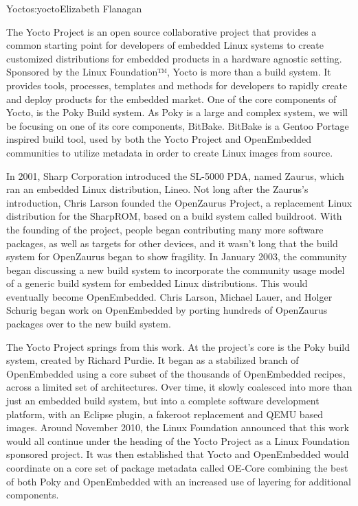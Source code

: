 \begin{aosachapter}{Yocto}{s:yocto}{Elizabeth Flanagan}

The Yocto Project\textsuperscript{\textregistered} is an open source
collaborative project that provides a common starting point for
developers of embedded Linux systems to create customized
distributions for embedded products in a hardware agnostic
setting. Sponsored by the Linux Foundation™, Yocto is more than a
build system. It provides tools, processes, templates and methods for
developers to rapidly create and deploy products for the embedded
market. One of the core components of Yocto, is the Poky Build
system. As Poky is a large and complex system, we will be focusing on
one of its core components, BitBake.  BitBake is a Gentoo Portage
inspired build tool, used by both the Yocto Project and OpenEmbedded
communities to utilize metadata in order to create Linux images from
source.

In 2001, Sharp Corporation introduced the SL-5000 PDA, named Zaurus,
which ran an embedded Linux distribution, Lineo. Not long after the
Zaurus's introduction, Chris Larson founded the OpenZaurus Project, a
replacement Linux distribution for the SharpROM, based on a build
system called buildroot. With the founding of the project, people
began contributing many more software packages, as well as targets for
other devices, and it wasn't long that the build system for OpenZaurus
began to show fragility. In January 2003, the community began
discussing a new build system to incorporate the community usage model
of a generic build system for embedded Linux distributions. This would
eventually become OpenEmbedded. Chris Larson, Michael Lauer, and
Holger Schurig began work on OpenEmbedded by porting hundreds of
OpenZaurus packages over to the new build system.

The Yocto Project springs from this work. At the project's core is the
Poky build system, created by Richard Purdie. It began as a stabilized
branch of OpenEmbedded using a core subset of the thousands of
OpenEmbedded recipes, across a limited set of architectures. Over
time, it slowly coalesced into more than just an embedded build
system, but into a complete software development platform, with an
Eclipse plugin, a fakeroot replacement and QEMU based images. Around
November 2010, the Linux Foundation announced that this work would all
continue under the heading of the Yocto Project as a Linux Foundation
sponsored project. It was then established that Yocto and OpenEmbedded
would coordinate on a core set of package metadata called OE-Core
combining the best of both Poky and OpenEmbedded with an increased use
of layering for additional components.


\end{aosachapter}
